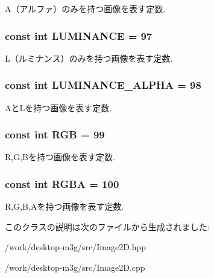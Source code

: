 A（アルファ）のみを持つ画像を表す定数. \hypertarget{classm3g_1_1Image2D_3cf02f5117269e8ff112cbf5ecb790cd}{
\subsubsection[{LUMINANCE}]{\setlength{\rightskip}{0pt plus 5cm}const int {\bf LUMINANCE} = 97}}
\label{classm3g_1_1Image2D_3cf02f5117269e8ff112cbf5ecb790cd}


L（ルミナンス）のみを持つ画像を表す定数. \hypertarget{classm3g_1_1Image2D_1a74b878039f244c27120cacb4eb6a3e}{
\subsubsection[{LUMINANCE\_\-ALPHA}]{\setlength{\rightskip}{0pt plus 5cm}const int {\bf LUMINANCE\_\-ALPHA} = 98}}
\label{classm3g_1_1Image2D_1a74b878039f244c27120cacb4eb6a3e}


AとLを持つ画像を表す定数. \hypertarget{classm3g_1_1Image2D_5f237f1b0f2ce6351e9e4a494b8dc759}{
\subsubsection[{RGB}]{\setlength{\rightskip}{0pt plus 5cm}const int {\bf RGB} = 99}}
\label{classm3g_1_1Image2D_5f237f1b0f2ce6351e9e4a494b8dc759}


R,G,Bを持つ画像を表す定数. \hypertarget{classm3g_1_1Image2D_0aaf9f2f4c064633c6d2888ec2c39e92}{
\subsubsection[{RGBA}]{\setlength{\rightskip}{0pt plus 5cm}const int {\bf RGBA} = 100}}
\label{classm3g_1_1Image2D_0aaf9f2f4c064633c6d2888ec2c39e92}


R,G,B,Aを持つ画像を表す定数. 

このクラスの説明は次のファイルから生成されました:\begin{CompactItemize}
\item 
/work/desktop-m3g/src/Image2D.hpp\item 
/work/desktop-m3g/src/Image2D.cpp\end{CompactItemize}
